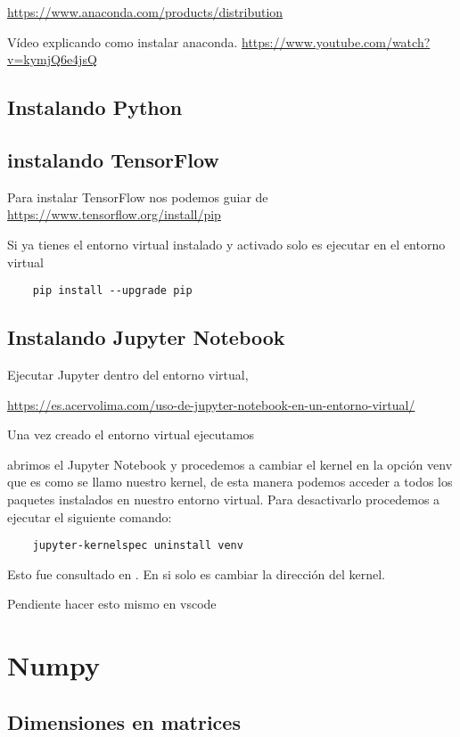 \url{https://www.anaconda.com/products/distribution}

V\'ideo explicando como instalar anaconda.
\url{https://www.youtube.com/watch?v=kymjQ6e4jsQ}
\section{Instalando Python}

\section{instalando TensorFlow}

Para instalar TensorFlow nos podemos guiar de \url{https://www.tensorflow.org/install/pip}

Si ya tienes el entorno virtual instalado y activado solo es ejecutar en el entorno virtual 
\begin{verbatim}
	pip install --upgrade pip
\end{verbatim}



\section{Instalando Jupyter Notebook}
Ejecutar Jupyter dentro del entorno virtual, 

\url{https://es.acervolima.com/uso-de-jupyter-notebook-en-un-entorno-virtual/}

Una vez creado el entorno virtual ejecutamos 

abrimos el Jupyter Notebook y procedemos a cambiar el kernel en la opci\'on venv que es como se llamo nuestro kernel, de esta manera podemos acceder a todos los paquetes instalados en nuestro entorno virtual. Para desactivarlo procedemos a ejecutar el siguiente comando: 
\begin{verbatim}
	jupyter-kernelspec uninstall venv
\end{verbatim}
Esto fue consultado en \cite{JupyterEnviroments}.
En si solo es cambiar la direcci\'on del kernel.

Pendiente hacer esto mismo en vscode

\chapter{Numpy}

\section{Dimensiones en matrices}

